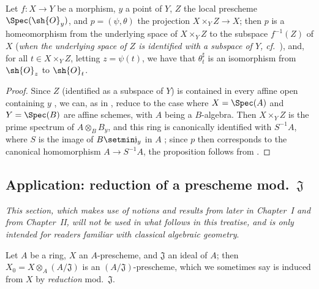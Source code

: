 \begin{proposition}[3.6.5]
\label{I.3.6.5}
Let $f:X\to Y$ be a morphism, $y$ a point of $Y$, $Z$ the local prescheme $\Spec(\sh{O}_y)$, and $p=(\psi,\theta)$ the projection $X\times_Y Z\to X$; then $p$ is a homeomorphism from the underlying space of $X\times_Y Z$ to the subspace $f^{-1}(Z)$ of $X$ (\emph{when the underlying space of $Z$ is identified with a subspace of $Y$, cf.~}), and, for all $t\in X\times_Y Z$, letting $z=\psi(t)$, we have that $\theta_t^\sharp$ is an isomorphism from $\sh{O}_z$ to $\sh{O}_t$.
\end{proposition}

\begin{proof}
Since $Z$ (identified as a subspace of $Y$) is contained in every affine open containing $y$ , we can, as in , reduce to the case where $X=\Spec(A)$ and $Y=\Spec(B)$ are affine schemes, with $A$ being a $B$-algebra.
Then $X\times_Y Z$ is the prime spectrum of $A\otimes_B B_y$, and this ring is canonically identified with $S^{-1}A$, where $S$ is the image of $B\setmin\mathfrak{j}_y$ in $A$ ; since $p$ then corresponds to the canonical homomorphism $A\to S^{-1}A$, the proposition follows from .
\end{proof}

\subsection{Application: reduction of a prescheme mod.~$\mathfrak{J}$}
\label{subsection:I.3.7}
\label{I.3.7}

\emph{This section, which makes use of notions and results from later in Chapter~I and from Chapter~II, will not be used in what follows in this treatise, and is only intended for readers familiar with classical algebraic geometry}.

\begin{env}[3.7.1]
\label{I.3.7.1}
Let $A$ be a ring, $X$ an $A$-prescheme, and $\mathfrak{J}$ an ideal of $A$; then $X_0=X\otimes_A(A/\mathfrak{J})$ is an $(A/\mathfrak{J})$-prescheme, which we sometimes say is induced from $X$ by \emph{reduction} mod.~$\mathfrak{J}$.
\end{env}

